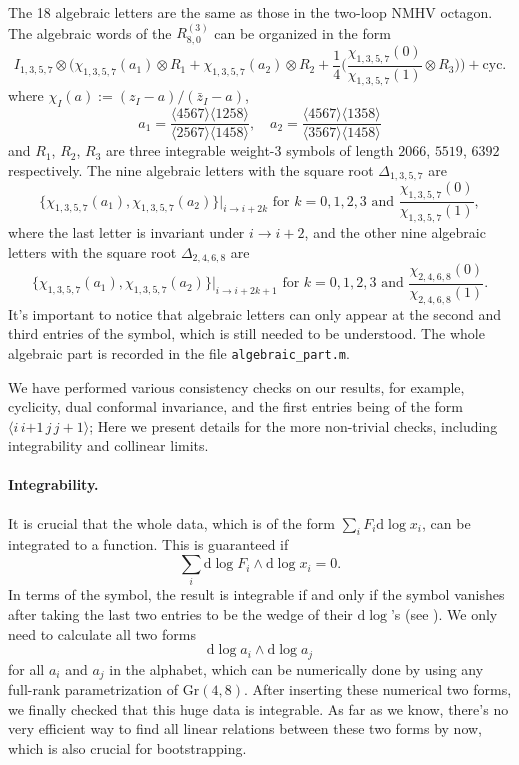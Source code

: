 \documentclass[a4paper,12pt]{article}
\newcommand{\dif}{\mathrm{d}} %
\begin{document}
The 18 algebraic letters are the same as those in the two-loop NMHV octagon. 
The algebraic words of the $R^{(3)}_{8,0}$ can be organized in the form 
\begin{equation}
    I_{1,3,5,7}\otimes \biggl(\chi_{1,3,5,7}(a_1)\otimes R_1+ \chi_{1,3,5,7}(a_2)\otimes R_2+\frac{1}{4}\biggl( \frac{\chi_{1,3,5,7}(0)}{\chi_{1,3,5,7}(1)}\otimes R_3\biggr)\biggr) + \text{cyc.}
\end{equation}
where $\chi_I(a):=(z_I-a)/(\bar z_I-a)$,
\[
a_1=\frac{\langle 4567\rangle \langle 1258\rangle}{\langle 2567\rangle \langle 1458\rangle},\quad
a_2=\frac{\langle 4567\rangle \langle 1358\rangle}{\langle 3567\rangle \langle 1458\rangle}
\]
and $R_1$, $R_2$, $R_3$ are three integrable weight-3 symbols of length $2066$, $5519$, $6392$ respectively. The nine algebraic letters with the square root $\Delta_{1,3,5,7}$ are 
\[
\{\chi_{1,3,5,7}(a_1),\chi_{1,3,5,7}(a_2)\}|_{i\to i+2k} \text{ for $k=0,1,2,3$ and } \frac{\chi_{1,3,5,7}(0)}{\chi_{1,3,5,7}(1)},
\]
where the last letter is invariant under $i\to i+2$, and the other nine algebraic letters with the square root $\Delta_{2,4,6,8}$ are 
\[
\{\chi_{1,3,5,7}(a_1),\chi_{1,3,5,7}(a_2)\}|_{i\to i+2k+1} \text{ for $k=0,1,2,3$ and } \frac{\chi_{2,4,6,8}(0)}{\chi_{2,4,6,8}(1)}.
\]
It's important to notice that algebraic letters can only appear at the second and third entries of the symbol, which is still needed to be understood. The whole algebraic part is recorded in the file {\tt algebraic\_part.m}.

We have performed various consistency checks on our results, for example, cyclicity, dual conformal invariance, and the first entries being of the form $\langle i\,i{+1}\,j\,j{+}1\rangle$; Here we present details for the more non-trivial checks, including integrability and collinear limits.

\paragraph*{Integrability.} It is crucial that the whole data, which is of the form $ \sum_i F_i \dif\log x_i$, can be integrated to a function. This is guaranteed if 
\[
    \sum_i \mathrm{d}\log F_i\wedge \mathrm{d}\log x_i=0.
\]
In terms of the symbol, the result is integrable if and only if the symbol vanishes after taking the last two entries to be the wedge of their $\mathrm{d}\log$'s  (see \cite{Chen:1977oja,brown2009multiple}).
We only need to calculate all two forms
\[
    \dif\log a_i\wedge \dif \log a_j
\]
for all $a_i$ and $a_j$ in the alphabet, which can be numerically done by using any full-rank parametrization of $\mathrm{Gr}(4,8)$. After inserting these numerical two forms, we finally checked that this huge data is integrable. As far as we know, there's no very efficient way to find all linear relations between these two forms by now, which is also crucial for bootstrapping.
\end{document}
